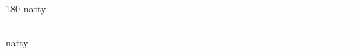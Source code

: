 
\begin{frame}
\begin{center}
\begin{turn}{180}
{\fontsize{2.5cm}{1em}\selectfont natty}
\end{turn}
\vspace{1em}\par  
\hrule
\vspace{1em}\par  
{\fontsize{2.5cm}{1em}\selectfont natty}
\end{center}
\end{frame}
